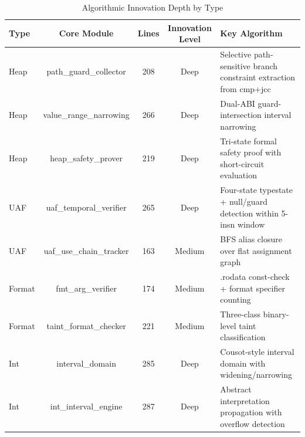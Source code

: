 \begin{table}[htbp]
  \centering
  \caption{Algorithmic Innovation Depth by Type}
  \label{tab:mimo-innovation}
  \begin{tabular}{lcccp{6cm}}
    \toprule
    \textbf{Type} & \textbf{Core Module} & \textbf{Lines} & \textbf{Innovation Level} & \textbf{Key Algorithm} \\
    \midrule
    Heap & path\_guard\_collector & 208 & Deep & Selective path-sensitive branch constraint extraction from cmp+jcc \\
    Heap & value\_range\_narrowing & 266 & Deep & Dual-ABI guard-intersection interval narrowing \\
    Heap & heap\_safety\_prover & 219 & Deep & Tri-state formal safety proof with short-circuit evaluation \\
    UAF & uaf\_temporal\_verifier & 265 & Deep & Four-state typestate + null/guard detection within 5-insn window \\
    UAF & uaf\_use\_chain\_tracker & 163 & Medium & BFS alias closure over flat assignment graph \\
    Format & fmt\_arg\_verifier & 174 & Medium & .rodata const-check + format specifier counting \\
    Format & taint\_format\_checker & 221 & Medium & Three-class binary-level taint classification \\
    Int & interval\_domain & 285 & Deep & Cousot-style interval domain with widening/narrowing \\
    Int & int\_interval\_engine & 287 & Deep & Abstract interpretation propagation with overflow detection \\
    \bottomrule
  \end{tabular}
\end{table}
